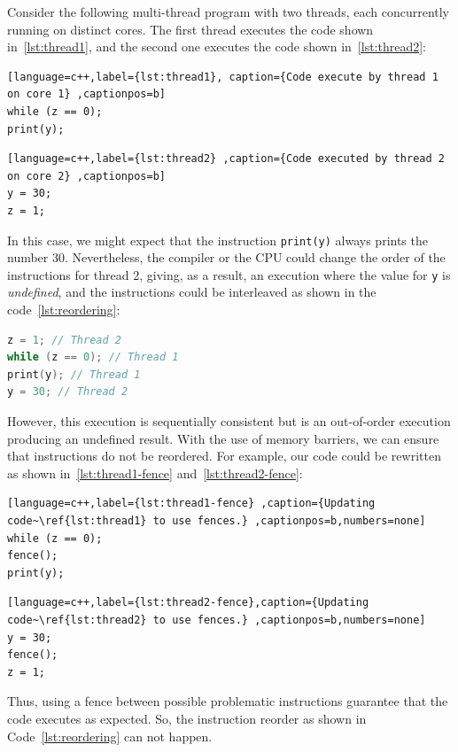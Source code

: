\begin{example}
\label{ex:reordering}
Consider the following multi-thread program with two threads, each concurrently running on distinct cores. The first thread executes the code shown in~\ref{lst:thread1}, and the second one executes the code shown in~\ref{lst:thread2}:

\begin{lstlisting}[language=c++,label={lst:thread1}, caption={Code execute by thread 1 on core 1} ,captionpos=b]
while (z == 0);
print(y);
\end{lstlisting}

\begin{lstlisting}[language=c++,label={lst:thread2} ,caption={Code executed by thread 2 on core 2} ,captionpos=b]
y = 30;
z = 1;
\end{lstlisting}


In this case, we might expect that the instruction \texttt{print(y)} always prints the number 30. Nevertheless, the compiler or the CPU could change the order of the instructions for thread 2, giving, as a result, an execution where the value for \texttt{y} is \emph{undefined}, and the instructions could be interleaved as shown in the code~\ref{lst:reordering}:

\begin{lstlisting}[language=c++,label={lst:reordering},caption={Code reordered by CPU}, captionpos=b]
z = 1; // Thread 2
while (z == 0); // Thread 1
print(y); // Thread 1
y = 30; // Thread 2
\end{lstlisting}

However, this execution is sequentially consistent but is an out-of-order execution producing an undefined result. With the use of memory barriers, we can ensure that instructions do not be reordered. For example, our code could be rewritten as shown in~\ref{lst:thread1-fence} and~\ref{lst:thread2-fence}:

\begin{lstlisting}[language=c++,label={lst:thread1-fence} ,caption={Updating code~\ref{lst:thread1} to use fences.} ,captionpos=b,numbers=none]
while (z == 0);
fence();
print(y);
\end{lstlisting}

\begin{lstlisting}[language=c++,label={lst:thread2-fence},caption={Updating code~\ref{lst:thread2} to use fences.} ,captionpos=b,numbers=none]
y = 30;
fence();
z = 1;
\end{lstlisting}

  Thus, using a fence between possible problematic instructions guarantee that the code executes as expected. So, the instruction reorder as shown in Code~\ref{lst:reordering} can not happen.

\end{example}

